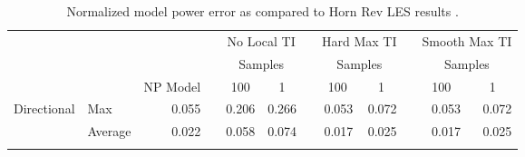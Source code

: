 \documentclass[conf]{new-aiaa}
\begin{document}
\begin{table}[htpb!]\centering
\caption{Normalized model power error as compared to Horn Rev LES results \cite{niayifar2016}.}\label{tab:validation-error}
\begin{tabular}{@{}llrcrrcrrcrr@{}}\toprule
& & & & \multicolumn{2}{c}{No Local TI} &\phantom{a}& \multicolumn{2}{c}{Hard Max TI} &\phantom{a}& \multicolumn{2}{c}{Smooth Max TI}\\ 
\cmidrule{5-6} \cmidrule{8-9} \cmidrule{11-12}

& &  &  \phantom{a} & \multicolumn{2}{c}{Samples} & \phantom{a}&\multicolumn{2}{c}{Samples} & \phantom{a}&\multicolumn{2}{c}{Samples}\\ 

& & \multicolumn{1}{c}{NP Model} & \phantom{a} & \multicolumn{1}{c}{100} & \multicolumn{1}{c}{1} & \phantom{a} &\multicolumn{1}{c}{100} & \multicolumn{1}{c}{1} & \phantom{a} & \multicolumn{1}{c}{100} & \multicolumn{1}{c}{1} \\ 
 \cmidrule{3-3} \cmidrule{5-6} \cmidrule{8-9} \cmidrule{11-12}



\multicolumn{1}{c|}{\multirow{2}{*}{Directional}}  &  \multicolumn{1}{l}{Max} &0.055 & & 0.206 &0.266  & & 0.053 &0.072  & & 0.053 & 0.072\\
\multicolumn{1}{c|}{} &  \multicolumn{1}{l}{Average} &0.022  & &0.058 &0.074 & & 0.017 &0.025 & & 0.017 &0.025\\

\\


\end{tabular}
\end{table}
\end{document}
